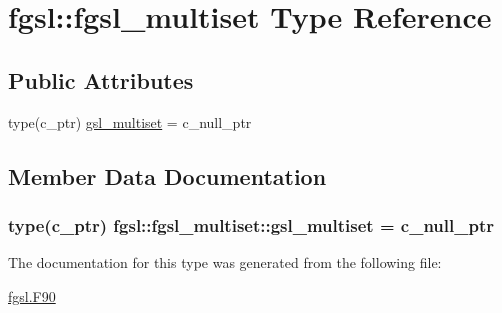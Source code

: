 \hypertarget{structfgsl_1_1fgsl__multiset}{}\section{fgsl\+:\+:fgsl\+\_\+multiset Type Reference}
\label{structfgsl_1_1fgsl__multiset}
\subsection*{Public Attributes}
\begin{DoxyCompactItemize}
\item 
type(c\+\_\+ptr) \hyperlink{structfgsl_1_1fgsl__multiset_a765558536dedfa6bd75d2d571a879185}{gsl\+\_\+multiset} = c\+\_\+null\+\_\+ptr
\end{DoxyCompactItemize}


\subsection{Member Data Documentation}
\hypertarget{structfgsl_1_1fgsl__multiset_a765558536dedfa6bd75d2d571a879185}{}
\subsubsection[{gsl\+\_\+multiset}]{\setlength{\rightskip}{0pt plus 5cm}type(c\+\_\+ptr) fgsl\+::fgsl\+\_\+multiset\+::gsl\+\_\+multiset = c\+\_\+null\+\_\+ptr}\label{structfgsl_1_1fgsl__multiset_a765558536dedfa6bd75d2d571a879185}


The documentation for this type was generated from the following file\+:\begin{DoxyCompactItemize}
\item 
\hyperlink{fgsl_8F90}{fgsl.\+F90}\end{DoxyCompactItemize}
